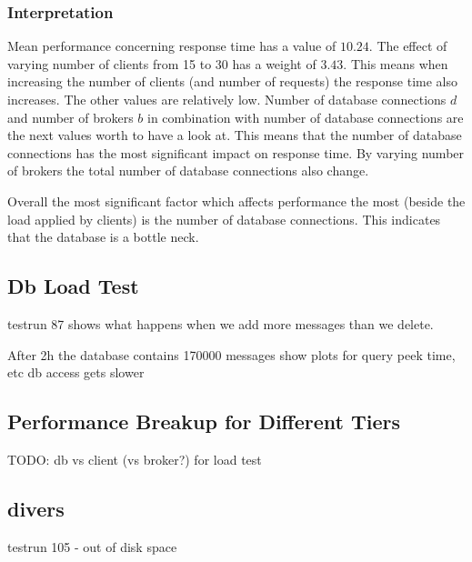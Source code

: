 \documentclass[milestone1.tex]{subfiles}
\begin{document}
\subsubsection{Interpretation}
Mean performance concerning response time has a value of $10.24$. The effect of varying number of clients from 15 to 30 has a weight of $3.43$. This means when increasing the number of clients (and number of requests) the response time also increases. The other values are relatively low. Number of database connections $d$ and number of brokers $b$ in combination with number of database connections  are the next values worth to have a look at. This means that the number of database connections has the most significant impact on response time. By varying number of brokers the total number of database connections also change.

Overall the most significant factor which affects performance the most (beside the load applied by clients) is the number of database connections. This indicates that the database is a bottle neck.

\subsection{Db Load Test}

testrun 87 shows what happens when we add more messages than we delete. 

After 2h the database contains 170000 messages
show plots for query peek time, etc
db access gets slower


\subsection{Performance Breakup for Different Tiers}

TODO: db vs client (vs broker?) for load test


\subsection{divers}

testrun 105 - out of disk space
\end{document}
